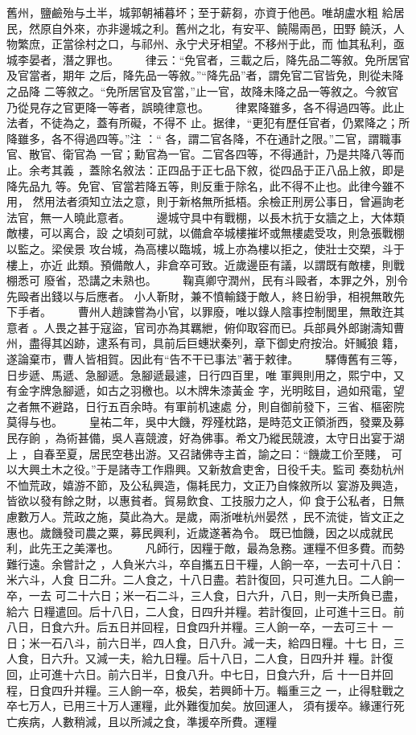 \documentclass{ctexart}
\begin{document}
舊州，鹽鹼殆与土半，城郭朝補暮坏；至于薪芻，亦資于他邑。唯胡盧水粗 給居民，然原自外來，亦非邊城之利。舊州之北，有安平、饒陽兩邑，田野 饒沃，人物繁庶，正當徐村之口，与祁州、永宁犬牙相望。不移州于此，而 恤其私利，亟城李晏者，潛之罪也。 　　律云：``免官者，三載之后，降先品二等敘。免所居官及官當者，期年 之后，降先品一等敘。''``降先品''者，謂免官二官皆免，則從未降之品降 二等敘之。``免所居官及官當，''止一官，故降未降之品一等敘之。今敘官 乃從見存之官更降一等者，誤曉律意也。 　　律累降雖多，各不得過四等。此止法者，不徒為之，蓋有所礙，不得不 止。据律，``更犯有歷任官者，仍累降之；所降雖多，各不得過四等。''注 ：`` 各，謂二官各降，不在通計之限。''二官，謂職事官、散官、衛官為 一官；勳官為一官。二官各四等，不得通計，乃是共降八等而止。余考其義 ，蓋除名敘法：正四品于正七品下敘，從四品于正八品上敘，即是降先品九 等。免官、官當若降五等，則反重于除名，此不得不止也。此律今雖不用， 然用法者須知立法之意，則于新格無所抵梧。余檢正刑房公事日，曾遍詢老 法官，無一人曉此意者。 　　邊城守具中有戰棚，以長木抗于女牆之上，大体類敵樓，可以离合，設 之頃刻可就，以備倉卒城樓摧坏或無樓處受攻，則急張戰棚以監之。梁侯景 攻台城，為高樓以臨城，城上亦為樓以拒之，使壯士交槊，斗于樓上，亦近 此類。預備敵人，非倉卒可致。近歲邊臣有議，以謂既有敵樓，則戰棚悉可 廢省，恐講之未熟也。 　　鞠真卿守潤州，民有斗毆者，本罪之外，別令先毆者出錢以与后應者。 小人靳財，兼不憤輸錢于敵人，終日紛爭，相視無敢先下手者。 　　曹州人趙諫嘗為小官，以罪廢，唯以錄人陰事控制閭里，無敢迕其意者 。人畏之甚于寇盜，官司亦為其羈紲，俯仰取容而已。兵部員外郎謝濤知曹 州，盡得其凶跡，逮系有司，具前后巨蟪狀秦列，章下御史府按治。奸贓狼 籍，遂論棄市，曹人皆相賀。因此有``告不干已事法''著于敕律。 　　驛傳舊有三等，日步遞、馬遞、急腳遞。急腳遞最遽，日行四百里，唯 軍興則用之，熙宁中，又有金字牌急腳遞，如古之羽檄也。以木牌朱漆黃金 字，光明眩目，過如飛電，望之者無不避路，日行五百余時。有軍前机速處 分，則自御前發下，三省、樞密院莫得与也。 　　皇祐二年，吳中大饑，殍殣枕路，是時范文正領浙西，發粟及募民存餉 ，為術甚備，吳人喜競渡，好為佛事。希文乃縱民競渡，太守日出宴于湖上 ，自春至夏，居民空巷出游。又召諸佛寺主首，諭之曰：``饑歲工价至賤， 可以大興土木之役。''于是諸寺工作鼎興。又新敖倉吏舍，日役千夫。監司 奏劾杭州不恤荒政，嬉游不節，及公私興造，傷耗民力，文正乃自條敘所以 宴游及興造，皆欲以發有餘之財，以惠貧者。貿易飲食、工技服力之人，仰 食于公私者，日無慮數万人。荒政之施，莫此為大。是歲，兩浙唯杭州晏然 ，民不流徙，皆文正之惠也。歲饑發司農之粟，募民興利，近歲遂著為令。 既已恤饑，因之以成就民利，此先王之美澤也。 　　凡師行，因糧于敵，最為急務。運糧不但多費。而勢難行遠。余嘗計之 ，人負米六斗，卒自攜五日干糧，人餉一卒，一去可十八日：米六斗，人食 日二升。二人食之，十八日盡。若計復回，只可進九日。二人餉一卒，一去 可二十六日；米一石二斗，三人食，日六升，八日，則一夫所負已盡，給六 日糧遣回。后十八日，二人食，日四升并糧。若計復回，止可進十三日。前 八日，日食六升。后五日并回程，日食四升并糧。三人餉一卒，一去可三十 一日；米一石八斗，前六日半，四人食，日八升。減一夫，給四日糧。十七 日，三人食，日六升。又減一夫，給九日糧。后十八日，二人食，日四升并 糧。計復回，止可進十六日。前六日半，日食八升。中七日，日食六升，后 十一日并回程，日食四升并糧。三人餉一卒，极矣，若興師十万。輜重三之 一，止得駐戰之卒七万人，已用三十万人運糧，此外難復加矣。放回運人， 須有援卒。緣運行死亡疾病，人數稍減，且以所減之食，準援卒所費。運糧 
\end{document}
